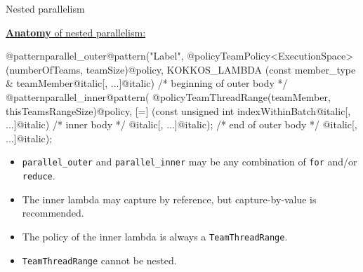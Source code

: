 \begin{frame}[fragile]{Nested parallelism}

  \ul{\textbf{Anatomy} of nested parallelism:}

  \vspace{-3pt}

  \begin{code}[linebackgroundcolor={
      },
      keywords={}
    ]
@patternparallel_outer@pattern("Label",
  @policyTeamPolicy<ExecutionSpace>(numberOfTeams, teamSize)@policy,
  KOKKOS_LAMBDA (const member_type & teamMember@italic[, ...]@italic) {
    /* beginning of outer body */
    @patternparallel_inner@pattern(
      @policyTeamThreadRange(teamMember, thisTeamsRangeSize)@policy,
      [=] (const unsigned int indexWithinBatch@italic[, ...]@italic) {
        /* inner body */
      }@italic[, ...]@italic);
    /* end of outer body */
  }@italic[, ...]@italic);
  \end{code}

  \vspace{-5pt}

  \begin{itemize}
    \item{\texttt{parallel\_outer} and \texttt{parallel\_inner} may be any combination of \texttt{for} and/or \texttt{reduce}.}
    \item{The inner lambda may capture by reference, but capture-by-value is recommended.}
    \item{The policy of the inner lambda is always a \texttt{TeamThreadRange}.}
    \item{\texttt{TeamThreadRange} cannot be nested.}
  \end{itemize}

\end{frame}


